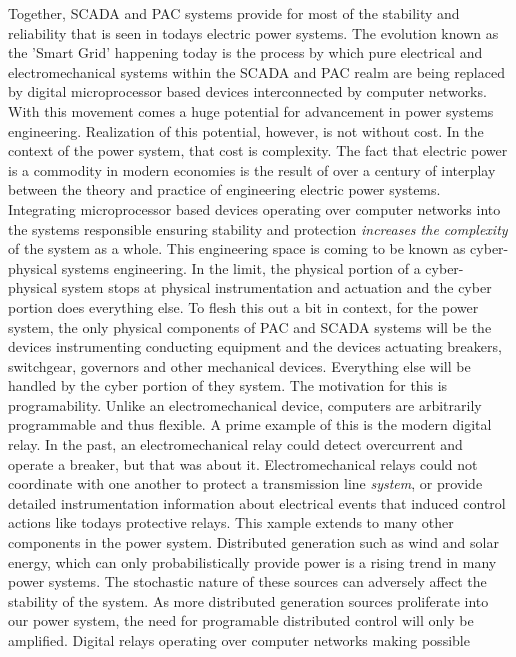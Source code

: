 \documentclass{article}
\begin{document}
Together, SCADA and PAC systems provide for most of the stability and reliability that 
is seen in todays electric power systems.  The evolution known as the 'Smart Grid' 
happening today is the process by which pure electrical and electromechanical systems 
within the SCADA and PAC realm are being replaced by digital microprocessor based 
devices interconnected by computer networks.  With this movement comes a huge potential 
for advancement in power systems engineering.  Realization of this potential, however, 
is not without cost.  In the context of the power system, that cost is complexity.  
The fact that electric power is a commodity in modern economies is the result of over 
a century of interplay between the theory and practice of engineering electric power 
systems.  Integrating microprocessor based devices operating over computer networks 
into the systems responsible ensuring stability and protection \emph{increases the 
complexity} of the system as a whole.  This engineering space is coming to be known as 
cyber-physical systems engineering.  In the limit, the physical portion of a 
cyber-physical system stops at physical instrumentation and actuation and the cyber 
portion does everything else.  To flesh this out a bit in context, for the power 
system, the only physical components of PAC and SCADA systems will be the devices 
instrumenting conducting equipment and the devices actuating breakers, switchgear, 
governors and other mechanical devices.  Everything else will be handled by the cyber 
portion of they system.  The motivation for this is programability.  Unlike an 
electromechanical device, computers are arbitrarily programmable and thus flexible. 
A prime example of this is the modern digital relay. In the past, an electromechanical 
relay could detect overcurrent and operate a breaker, but that was about it.  
Electromechanical relays could not coordinate with one another to protect a 
transmission line \emph{system}, or provide detailed instrumentation information about 
electrical events that induced control actions like todays protective relays.  This 
xample extends to many other components in the power system.  Distributed generation 
such as wind and solar energy, which can only probabilistically provide power is a 
rising trend in many power systems.  The stochastic nature of these sources can 
adversely affect the stability of the system. As more distributed generation sources 
proliferate into our power system, the need for programable distributed control will 
only be amplified. Digital relays operating over computer networks making possible 
\end{document}
